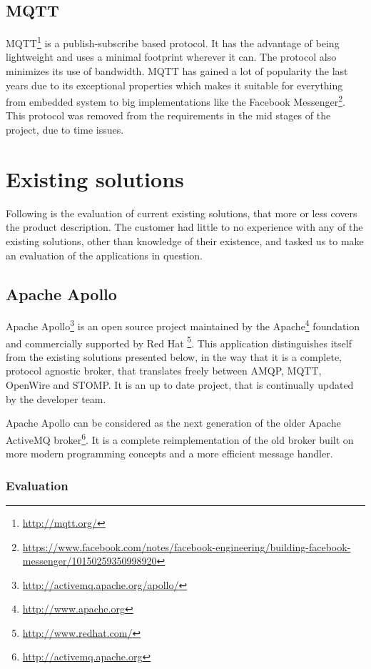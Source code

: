 \subsection{MQTT}
MQTT\footnote{\url{http://mqtt.org/}} is a publish-subscribe based protocol. It has the advantage of being lightweight and uses a minimal footprint wherever it can. The protocol also minimizes its use of bandwidth. MQTT has gained a lot of popularity the last years due to its exceptional properties which makes it suitable for everything from embedded system to big implementations like the Facebook Messenger\footnote{\url{https://www.facebook.com/notes/facebook-engineering/building-facebook-messenger/10150259350998920}}. This protocol was removed from the requirements in the mid stages of the project, due to time issues.

\section{Existing solutions}

Following is the evaluation of current existing solutions, that more or less covers the product description. The customer had little to no experience with any of the existing solutions, other than knowledge of their existence, and tasked us to make an evaluation of the applications in question.

\subsection{Apache Apollo}

Apache Apollo\footnote{\url{http://activemq.apache.org/apollo/}} is an open source project maintained by the Apache\footnote{\url{http://www.apache.org}} foundation and commercially supported by Red Hat \footnote{\url{http://www.redhat.com/}}. This application distinguishes itself from the existing solutions presented below, in the way that it is a complete, protocol agnostic broker, that translates freely between AMQP, MQTT, OpenWire and STOMP. It is an up to date project, that is continually updated by the developer team.

Apache Apollo can be considered as the next generation of the older Apache ActiveMQ broker\footnote{\url{http://activemq.apache.org}}. It is a complete reimplementation of the old broker built on more modern programming concepts and a more efficient message handler.    

\subsubsection{Evaluation}

